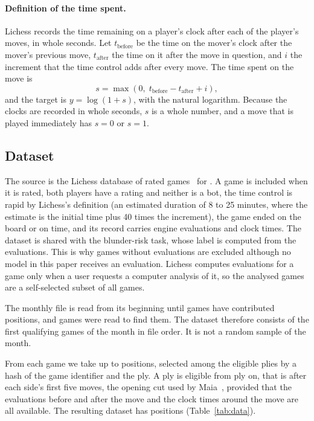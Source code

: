 \documentclass[11pt]{article}
\begin{document}
\paragraph{Definition of the time spent.}
Lichess records the time remaining on a player's clock after each of the
player's moves, in whole seconds. Let $t_{\mathrm{before}}$ be the time on
the mover's clock after the mover's previous move, $t_{\mathrm{after}}$ the
time on it after the move in question, and $i$ the increment that the time
control adds after every move. The time spent on the move is
\[
s = \max(0,\; t_{\mathrm{before}} - t_{\mathrm{after}} + i),
\]
and the target is $y = \log(1 + s)$, with the natural logarithm. Because the
clocks are recorded in whole seconds, $s$ is a whole number, and a move that
is played immediately has $s = 0$ or $s = 1$.

\subsection{Dataset}

The source is the Lichess database of rated games~\cite{lichessdb} for
. A game is included when it is rated, both players have a
rating and neither is a bot, the time control is rapid by Lichess's
definition (an estimated duration of 8 to 25 minutes, where the estimate is
the initial time plus 40 times the increment), the game ended on the board
or on time, and its record carries engine evaluations and clock times. The
dataset is shared with the blunder-risk task, whose label is computed from
the evaluations. This is why games without evaluations are excluded although
no model in this paper receives an evaluation. Lichess computes evaluations
for a game only when a user requests a computer analysis of it, so the
analysed games are a self-selected subset of all games.

The monthly file is read from its beginning until  games have
contributed positions, and  games were read to find
them. The dataset therefore consists of the first qualifying games of the
month in file order. It is not a random sample of the month.

From each game we take up to  positions, selected among
the eligible plies by a hash of the game identifier and the ply. A ply is
eligible from ply  on, that is after each side's first five
moves, the opening cut used by Maia~\cite{maia}, provided that the
evaluations before and after the move and the clock times around the move are
all available. The resulting dataset has  positions
(Table~\ref{tab:data}).
\end{document}
